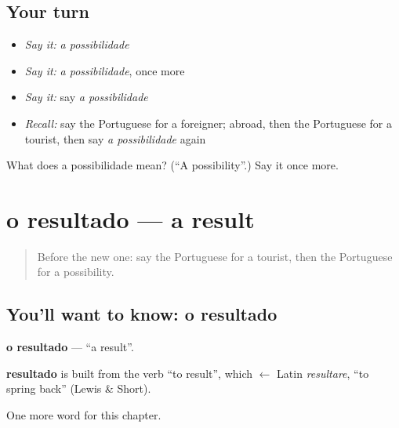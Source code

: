 \subsection*{Your turn}
\begin{itemize}
\raggedright
  \item \emph{Say it:} \emph{a possibilidade}
  \item \emph{Say it:} \emph{a possibilidade}, once more
  \item \emph{Say it:} say \emph{a possibilidade}
  \item \emph{Recall:} say the Portuguese for a foreigner; abroad, then the Portuguese for a tourist, then say \emph{a possibilidade} again
\end{itemize}

\begin{tcolorbox}[breakable,colback=teal!4,colframe=teal!35!black,title={Before you move on}]
What does a possibilidade mean? (\textquotedblleft{}A possibility\textquotedblright{}.) Say it once more.
\end{tcolorbox}
\section[o resultado]{o resultado — a result}

\label{lesson:PT-C161-resultado}



\begin{quote}
Before the new one: say the Portuguese for a tourist, then the Portuguese for a possibility.
\end{quote}

\subsection*{You'll want to know: o resultado}
\textbf{o resultado} — \textquotedblleft{}a result\textquotedblright{}.

\begin{cousinweb}
\textbf{resultado} is built from the verb \textquotedblleft{}to result\textquotedblright{}, which $\leftarrow$ Latin \emph{resultare}, \textquotedblleft{}to spring back\textquotedblright{} (Lewis \& Short).
\end{cousinweb}

\begin{grammarlens}[title={What you've built}]
One more word for this chapter.
\end{grammarlens}

